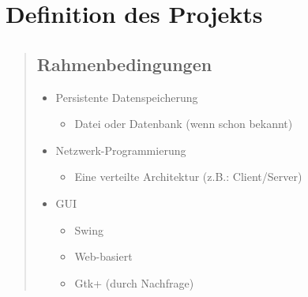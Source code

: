 \chapter{Definition des Projekts}

\begin{quote}
    \section{Rahmenbedingungen}
    \renewcommand{\labelitemi}{•}
    \begin{itemize}
        \item Persistente Datenspeicherung
        \begin{itemize}
	    \item Datei oder Datenbank (wenn schon bekannt)
        \end{itemize}
        \item Netzwerk-Programmierung
        \begin{itemize}
	    \item Eine verteilte Architektur (z.B.: Client/Server)
        \end{itemize}
        \item GUI
        \begin{itemize}
	    \item Swing
	    \item Web-basiert
	    \item Gtk+ (durch Nachfrage)
        \end{itemize}
    \end{itemize}

\end{quote}

